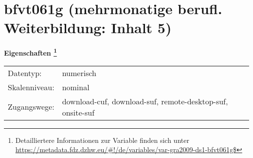 
    \setcounter{footnote}{0}

    \vspace*{-1.8cm}
	\section{bfvt061g (mehrmonatige berufl. Weiterbildung: Inhalt 5)}
	\label{section:bfvt061g}



    \vspace*{0.5cm}
    \noindent\textbf{Eigenschaften
	\footnote{Detailliertere Informationen zur Variable finden sich unter
		\url{https://metadata.fdz.dzhw.eu/\#!/de/variables/var-gra2009-ds1-bfvt061g$}}}\\
	\begin{tabularx}{\hsize}{@{}lX}
	Datentyp: & numerisch \\
	Skalenniveau: & nominal \\
	Zugangswege: &
	  download-cuf, 
	  download-suf, 
	  remote-desktop-suf, 
	  onsite-suf
 \\
    \end{tabularx}



